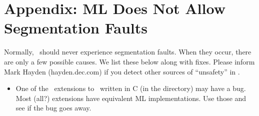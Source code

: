 \section{Appendix: ML Does Not Allow Segmentation Faults}

Normally, \ensemble\ should never experience segmentation faults.  When they occur,
there are only a few possible causes.  We list these below along with fixes.  Please
inform Mark Hayden (hayden\@pa.dec.com) if you detect other sources of
``unsafety'' in \ensemble.
\begin{itemize}
\item
One of the \ensemble\ extensions to \caml\ written in C (in the
 directory) may have a bug.  Most (all?) extensions have
equivalent ML implementations.  Use those and see if the bug goes away.
\end{itemize}

